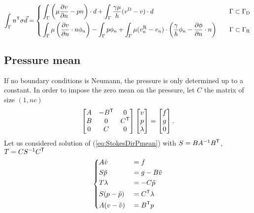 %
%
\begin{equation}\label{eq:}
%
\int_{\Gamma} \transpose{n}\sigma \vec{d} =
\left\{
\begin{aligned}
& 
 \int_{\Gamma} \left(  \mu\dn{v} -p n  \right)\cdot  d
+\int_{\Gamma}\frac{\gamma\mu}{h}(\vD-v)\cdot d
&\quad \Gamma\subset\GammaD\\ 
& 
 \int_{\Gamma} \mu\left( \dn{v}\cdot n \phi_n \right)
- \int_{\Gamma} p\phi_n  
+\int_{\Gamma}\mu(\vRn-v_n)\cdot\left( \frac{\gamma}{h}\phi_n - \dn{\phi}\cdot n\right)
&\quad \Gamma\subset\GammaR
\end{aligned}
\right.
%
\end{equation}
% 
%
\subsection{Pressure mean}\label{subsec:}
%
If no boundary conditions is Neumann, the pressure is only determined up to a constant. In order to impose the zero mean on the pressure, let $C$ the matrix of size $(1,nc)$
%
\begin{equation}\label{eq:StokesDirPmean}
\begin{bmatrix}
A  & -{B}^{\mathsf{T}}& 0\\
B & 0 & {C}^{\mathsf{T}}\\
0 & C & 0
\end{bmatrix}
\begin{bmatrix}
v\\
p\\
\lambda
\end{bmatrix}
=
\begin{bmatrix}
f\\
g\\
0
\end{bmatrix}.
\end{equation}
%
Let us considered solution of (\ref{eq:StokesDirPmean}) with $S=BA^{-1}{B}^{\mathsf{T}}$, $T=CS^{-1}{C}^{\mathsf{T}}$
%
\begin{equation}\label{eq:}
%
\left\{
\begin{aligned}
&A \tilde v &&= f\\
&S \tilde p &&= g-B\tilde v\\
&T \lambda &&= -C\tilde p\\
&S (p-\tilde p) &&= \transpose{C} \lambda\\
&A(v-\tilde v) &&=  \transpose{B} p
\end{aligned}
\right.
%
\end{equation}
%
%
